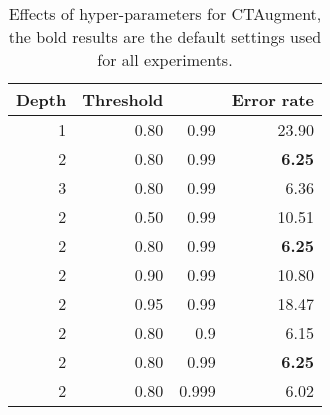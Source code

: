 \documentclass{article} \usepackage{iclr2020_conference,times}
\begin{document}
\begin{table}[h!]
\centering
\begin{tabular}{rrrr}
\toprule
Depth & Threshold &  & Error rate \\
\midrule
1 & 0.80 & 0.99 & 23.90 \\
2 & 0.80 & 0.99 & \textbf{6.25} \\
3 & 0.80 & 0.99 & 6.36 \\
\midrule
2 & 0.50 & 0.99 & 10.51 \\
2 & 0.80 & 0.99 & \textbf{6.25} \\
2 & 0.90 & 0.99 & 10.80 \\
2 & 0.95 & 0.99 & 18.47 \\
\midrule
2 & 0.80 & 0.9 & 6.15 \\
2 & 0.80 & 0.99 & \textbf{6.25} \\
2 & 0.80 & 0.999 & 6.02 \\
\bottomrule
\end{tabular}
\caption{Effects of hyper-parameters for CTAugment, the bold results are the default settings used for all experiments.}
\end{table}
\end{document}
